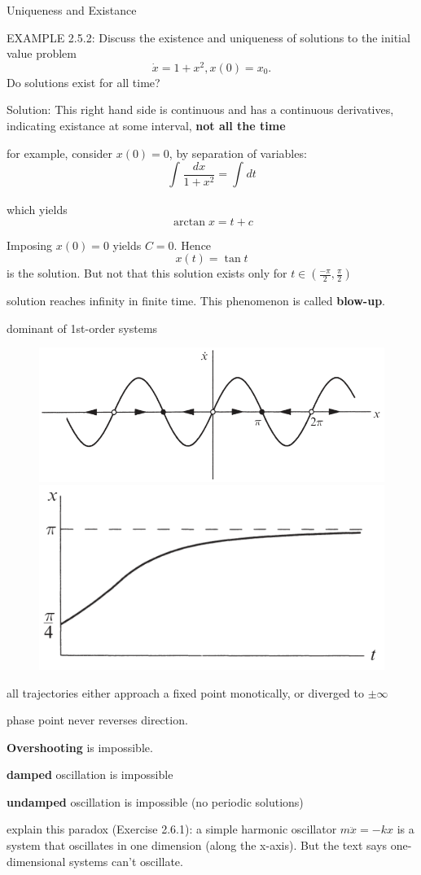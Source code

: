 \documentclass[9pt,aspectratio=43,mathserif,table]{beamer}
\begin{document}
\begin{frame}{Uniqueness and Existance }
  \begin{multicols}{2}
   EXAMPLE 2.5.2: Discuss the existence and uniqueness of solutions to the initial value problem 
  $$\dot x = 1 + x^ 2 , x(0)= x_0.$$ Do solutions exist for all time?

  Solution: This right hand side is continuous and has a continuous derivatives, indicating existance at some interval, \textbf{not all the time}

  for example, consider $x(0) = 0$, by separation of variables:
  $$\int_{ }^{}\frac{ dx}{1 + x^2} = \int_{ }^{}dt$$

  which yields
  $$\arctan x = t + c$$

  Imposing $x(0) = 0$ yields $C = 0$. Hence  $$x(t) = \tan t$$ is the solution. But not that this solution exists only for $t \in (\frac{ -\pi}{2}, \frac{ \pi}{2})$

  \end{multicols}
  solution reaches infinity in finite time. This phenomenon is called \textbf{blow-up}.
\end{frame}

\begin{frame}{dominant of 1st-order systems}
    \begin{figure}[!h]
      \centering
      \includegraphics[width=.5\textwidth]{fig/vectorfield.png}
      \includegraphics[width=.4\textwidth]{fig/solution_2.1.1.png}
    \end{figure}
all trajectories either approach a fixed point monotically, or diverged to $\pm \infty$

phase point never reverses direction.

\medskip

\textbf{Overshooting} is impossible.

\textbf{damped} oscillation is impossible

\textbf{undamped} oscillation is impossible (no periodic solutions)
   
\medskip 

explain this paradox (Exercise 2.6.1):
a simple harmonic oscillator $m\ddot x = -kx$ is a system that oscillates in one dimension (along the x-axis). But the text says one-dimensional systems can't oscillate.
\end{frame}
\end{document}

